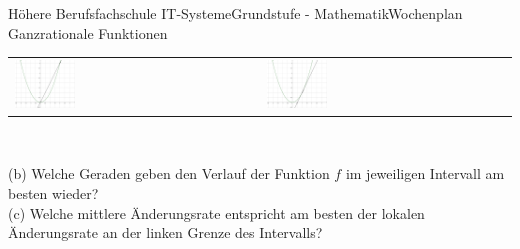 \documentclass[oneside,openany,headings=optiontotoc,11pt,numbers=noenddot]{scrreprt}
\begin{document}
\begin{worksheet}{Höhere Berufsfachschule IT-Systeme}{Grundstufe - Mathematik}{Wochenplan Ganzrationale Funktionen}
\begin{framed}
\begin{tabularx}{\textwidth}{M|M}
				\\
				\includegraphics[width=0.25\textwidth]{../99_Bilder/WP/WP12_T5_a3.png} & \includegraphics[width=0.25\textwidth]{../99_Bilder/WP/WP12_T5_a4.png}
			\end{tabularx}\\
			\par\noindent
			(b) Welche Geraden geben den Verlauf der Funktion \(f\) im jeweiligen Intervall am besten wieder?\\
			(c) Welche mittlere Änderungsrate entspricht am besten der lokalen Änderungsrate an der linken Grenze des Intervalls?
		\end{framed}
	\end{worksheet}
	\newpage
	
	
\end{document}
